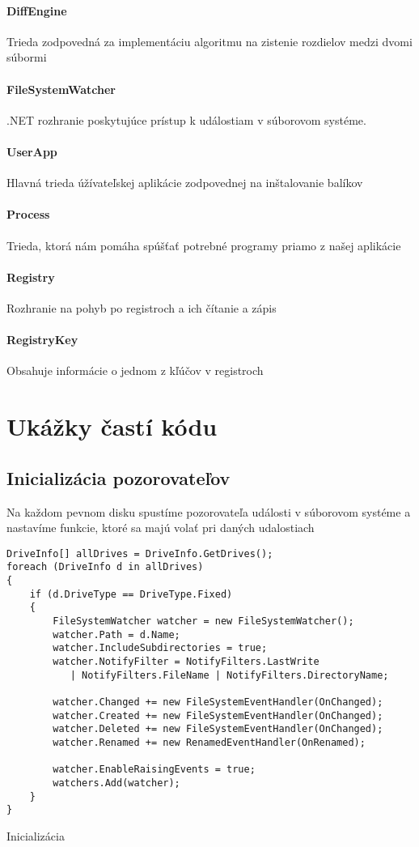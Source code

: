 \paragraph{DiffEngine}
Trieda zodpovedná za implementáciu algoritmu na zistenie rozdielov medzi dvomi súbormi
\paragraph{FileSystemWatcher}
.NET rozhranie poskytujúce prístup k událostiam v súborovom systéme.
\paragraph{UserApp}
Hlavná trieda úžívateľskej aplikácie zodpovednej na inštalovanie balíkov
\paragraph{Process}
Trieda, ktorá nám pomáha spúšťať potrebné programy priamo z našej aplikácie
\paragraph{Registry}
Rozhranie na pohyb po registroch a ich čítanie a zápis
\paragraph{RegistryKey}
Obsahuje informácie o jednom z kľúčov v registroch

\section{Ukážky častí kódu}

\subsection{Inicializácia pozorovateľov}
Na každom pevnom disku spustíme pozorovateľa události v súborovom systéme a nastavíme funkcie, ktoré sa majú volať pri daných udalostiach
\begin{listing}
\begin{verbatim}
DriveInfo[] allDrives = DriveInfo.GetDrives();
foreach (DriveInfo d in allDrives)
{
    if (d.DriveType == DriveType.Fixed) 
    { 
        FileSystemWatcher watcher = new FileSystemWatcher();
        watcher.Path = d.Name;
        watcher.IncludeSubdirectories = true;
        watcher.NotifyFilter = NotifyFilters.LastWrite
           | NotifyFilters.FileName | NotifyFilters.DirectoryName;

        watcher.Changed += new FileSystemEventHandler(OnChanged);
        watcher.Created += new FileSystemEventHandler(OnChanged);
        watcher.Deleted += new FileSystemEventHandler(OnChanged);
        watcher.Renamed += new RenamedEventHandler(OnRenamed);

        watcher.EnableRaisingEvents = true;
        watchers.Add(watcher);
    }
}         
\end{verbatim}
\caption{Inicializácia}
\label{lst:init}
\end{listing}

